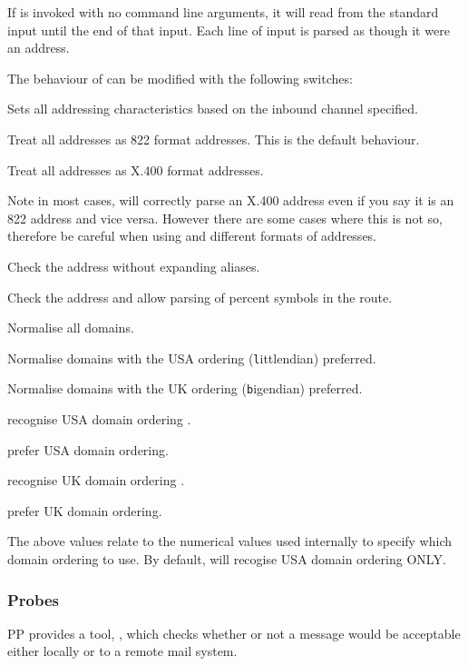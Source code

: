 If  is invoked with no command line arguments, it will
read from the standard input until the end of that input.
Each line of input is parsed as though it were an address.

The behaviour of  can be modified with the following
switches:
\begin{describe}
\item[\verb|-i inboundChan|] Sets all addressing characteristics based
on the inbound channel specified.
\item[\verb|-r|:] Treat all addresses as 822 format addresses.
This is the default behaviour.
\item[\verb|-x|:] Treat all addresses as X.400 format addresses.

Note in most cases,  will correctly parse an X.400 address
even if you say it is an 822 address and vice versa.
However there are some cases where this is not so, therefore be
careful when using  and different formats of addresses.

\item[\verb|-n|:] Check the address without expanding aliases.
\item[\verb|-p|:] Check the address and allow parsing of percent
symbols in the route.
\item[\verb|-a|:] Normalise all domains.
\item[\verb|-l|:] Normalise domains with the USA ordering
(\verb|l|ittlendian) preferred.
\item[\verb|-b|:] Normalise domains with the UK ordering
(\verb|b|igendian) preferred.
\item[\verb|-0|:] recognise USA domain ordering .
\item[\verb|-1|:] prefer USA domain ordering.
\item[\verb|-2|:] recognise UK domain ordering .
\item[\verb|-3|:] prefer UK domain ordering.

The above values relate to the numerical values used
internally to specify which domain ordering to use.
By default,  will recogise USA domain ordering ONLY.

\end{describe}

\subsubsection{Probes}
PP provides a tool, , which checks whether or not a 
message would be acceptable either locally or to a remote mail system.

